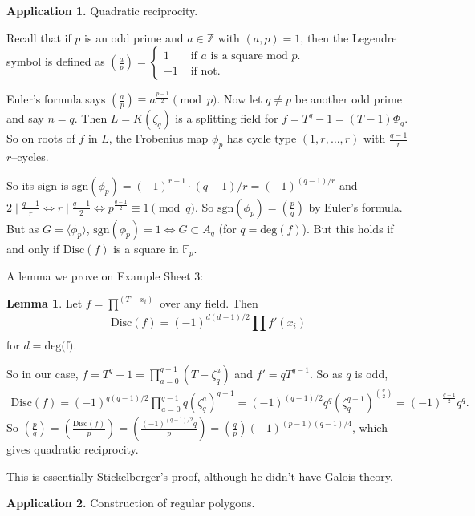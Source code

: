 \documentclass{article}
\theoremstyle{definition}
\newtheorem{lemma}[theorem]{Lemma}
\begin{document}
\textbf{Application 1.} Quadratic reciprocity.

Recall that if $p$ is an odd prime and $a \in \mathbb{Z}$ with $(a,p)=1$, then the Legendre symbol is defined as $\left( \frac{a}{p} \right) = \begin{cases}
    1 &\text{ if } a \text{ is a square mod }p.\\
    -1 &\text{ if not.}
\end{cases}$
\vspace{1mm}

Euler's formula says $\left( \frac{a}{p} \right) \equiv a^{\frac{p-1}{2}} \pmod{p}$. Now let $q \neq p$ be another odd prime and say $n=q$. Then $L=K(\zeta_q)$ is a splitting field for $f=T^q-1 = (T-1)\Phi_q$. So on roots of $f$ in $L$, the Frobenius map $\phi_p$ has cycle type $(1,r,\ldots,r)$ with $\frac{q-1}{r}$ $r$--cycles. 

So its sign is $\text{sgn}(\phi_p) = (-1)^{r-1}\cdot (q-1)/r = (-1)^{(q-1)/r}$ and $2 \mid \frac{q-1}{r} \iff r \mid \frac{q-1}{2} \iff p^{\frac{q-1}{2}} \equiv 1 \pmod{q}$. So $\text{sgn}(\phi_p) = \left( \frac{p}{q} \right)$ by Euler's formula. But as $G = \langle \phi_p \rangle$, $\text{sgn}(\phi_p) = 1 \iff G \subset A_q$ (for $q=\text{deg}(f)$). But this holds if and only if $\text{Disc}(f)$ is a square in $\mathbb{F}_p$.
\vspace{1mm}

A lemma we prove on Example Sheet 3:
\begin{lemma}
    Let $f=\prod_{}^{(T-x_i)}$ over any field. Then $$\text{Disc}(f)= (-1)^{d(d-1)/2}\prod_{}^{} f'(x_i)$$ for $d=\text{deg(f)}$.
\end{lemma}

So in our case, $f=T^q-1 = \prod_{a=0}^{q-1} (T-\zeta_q^a)$ and $f'=qT^{q-1}$. So as $q$ is odd, 
\begin{align*}
    \text{Disc}(f) = (-1)^{q(q-1)/2} \prod_{a=0}^{q-1} q (\zeta_q^a)^{q-1} = (-1)^{(q-1)/2}q^q (\zeta_q^{q-1})^{{q \choose 2}} = (-1)^{\frac{q-1}{2}}q^q.
\end{align*}
So $\left( \frac{p}{q} \right)  = \left( \frac{\text{Disc}(f)}{p} \right) =\left( \frac{(-1)^{(q-1)/2}q}{p} \right) = \left( \frac{q}{p} \right) (-1)^{(p-1)(q-1)/4}$, which gives quadratic reciprocity.

This is essentially Stickelberger's proof, although he didn't have Galois theory.
\vspace{1mm}

\textbf{Application 2.} Construction of regular polygons.
\vspace{1mm}
\end{document}
